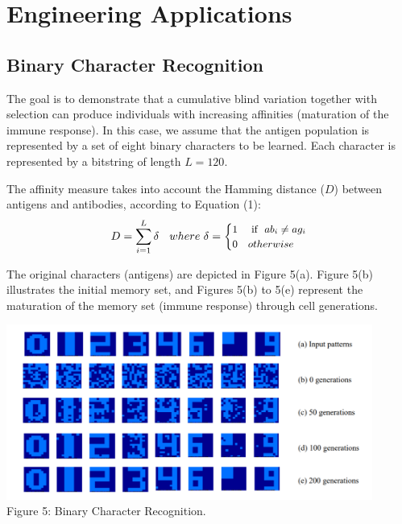 \documentclass{article}
\begin{document}
\section{Engineering Applications}
\subsection{Binary Character Recognition}
The goal is to demonstrate that a cumulative blind variation together with selection can produce individuals with increasing affinities (maturation of the immune response). In this case, we assume that the antigen population is represented by a set of eight binary characters to be learned. Each character is represented by a bitstring of length \begin{math} L = 120 \end{math}.

The affinity measure takes into account the Hamming distance (\begin{math} D \end{math}) between antigens and antibodies, according to Equation (1):
\begin{equation} \small{
D =\sum_{i=1}^{L} \delta \quad where \  \delta = \begin{cases} 1 & \mbox{ if } \  ab_i \neq ag_i \\
0  & otherwise \end{cases}}
 \end{equation}

The original characters (antigens) are depicted in Figure 5(a). Figure 5(b) illustrates the initial memory set, and Figures 5(b) to 5(e) represent the maturation of the memory set (immune response) through cell generations.

\begin{center} 
\includegraphics[width=12cm,clip]{images/cj_binary_pattern_learn.png}\\
\caption{Figure 5: Binary Character Recognition.}	
\end{center} 
\end{document}
